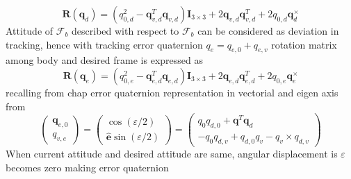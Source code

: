 \begin{equation}
\mathbf{R} (\mathbf{q}_{d} )=\left( q^{2}_{0,d} -\mathbf{q}^{T}_{v,d}\mathbf{q}_{v,d}\right)\mathbf{I}_{3\times 3} +2\mathbf{q}_{v,d}\mathbf{q}^{T}_{v,d} +2q_{0,d}\mathbf{q}^{\times }_{d}
\end{equation}Attitude of $\displaystyle \mathcal{F}_{b}$ described with respect to $\displaystyle \mathcal{F}_{b}$ can be considered as deviation in tracking, hence with tracking error quaternion $\displaystyle q_{e} =q_{e,0} +q_{e,v}$ rotation matrix among body and desired frame is expressed as\begin{equation}
\mathbf{R} (\mathbf{q}_{e} )=\left( q^{2}_{0,e} -\mathbf{q}^{T}_{e,d}\mathbf{q}_{e,d}\right)\mathbf{I}_{3\times 3} +2\mathbf{q}_{e,d}\mathbf{q}^{T}_{e,d} +2q_{0,e}\mathbf{q}^{\times }_{e}
\end{equation}recalling from chap error quaternion representation in vectorial and eigen axis from
\begin{equation}
\begin{pmatrix}
\mathbf{q}_{e,0}\\
q_{v,e}
\end{pmatrix} =\begin{pmatrix}
\cos( \varepsilon /2) \ \\
\mathbf{\hat{e}}\sin( \varepsilon /2)
\end{pmatrix} =\begin{pmatrix}
q_{0} q_{d,0} +\mathbf{q}^{T}\mathbf{q}_{d}\\
-q_{0} q_{d,v} +q_{d,0} q_{v} -q_{v} \times q_{d,v}
\end{pmatrix}
\end{equation}
When current attitude and desired attitude are same, angular displacement is $\displaystyle \varepsilon $ becomes zero making error quaternion

